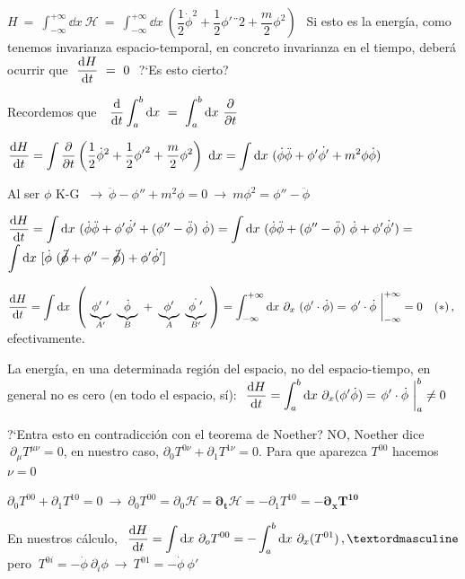 $\displaystyle H \ = \ \int_{-\infty}^{+\infty} \dd x \ \mathcal H \ = \ \int_{-\infty}^{+\infty} \dd x  \ \left( \dfrac 1 2 \dot \phi^2 + \dfrac 1 2 {\phi'}¨2+\dfrac m 2 \phi^2 \right)\ \ $ Si esto es la energía, como tenemos invarianza espacio-temporal, en concreto invarianza en el tiempo, deberá ocurrir que $\ \displaystyle \dv{H}{t} \ = \ 0 \ $ ?`Es esto cierto?

\textcolor{gris}{ Recordemos que $\ \ \displaystyle \dv{t} \int_a^b \dd x \ = \ \int_a^b \dd x \ \pdv{t} $}

\vspace{3mm}

$\displaystyle \dv{H}{t}=\int \pdv{t} \left( \dfrac 1 2 \dot \phi^2 + \dfrac 1 2 {\phi'}^2 + \dfrac m 2 \phi^2 \right) \ \dd x = \int \dd x \ (\dot \phi \ddot \phi + \phi' \dot{\phi'} + m^2 \phi \dot \phi) $

Al ser $\phi$ K-G $ \ \to \ \ddot \phi - \phi'' + m^2 \phi=0 \ \to \ m\phi^2=\phi''-\ddot \phi$

$\displaystyle \dv{H}{t}=  \int \dd x \ ( \dot \phi \ddot \phi + \phi' \dot{\phi'} + (\phi''-\ddot \phi) \ \dot \phi )=
\int \dd x \ ( \dot \phi \ddot \phi + (\phi''-\ddot \phi) \ \dot \phi + \phi' \dot{\phi'}  )=$
$\displaystyle \int \dd x \  [ \dot \phi \ (\cancel{\ddot \phi} + \phi'' - \cancel{\ddot \phi} ) + \phi' \dot{\phi'} ]   $

$\displaystyle \dv{H}{t}=\int \dd x \ \left( \  \underbrace{ \phi'\ '}_{A'}  \ \underbrace{\dot \phi}_{B} \ + \  \underbrace{\phi'}_{A} \  \underbrace{\dot{\phi \ '}}_{B'} \  \right) = \int_{-\infty}^{+\infty} \dd x \ \partial_x \ (\phi' \cdot \dot \phi ) = \eval{\phi' \cdot \dot \phi \ }_{-\infty}^{+\infty} = 0 \quad (*) \, , \ $ efectivamente.

La energía, en una determinada región del espacio, no del espacio-tiempo, en general no es cero (en todo el espacio, sí): $\ \displaystyle \dv{H}{t}=\int_a^b \dd x \ \partial_x (\phi' \dot \phi)=\eval{\phi' \cdot \dot \phi \ }_{a}^{b} \neq 0$


?`Entra esto en contradicción con el teorema de Noether? NO, Noether dice $\ \partial_\mu T^{\mu \nu} = 0 $, en nuestro caso, 
$\partial_0 T^{0\nu}+\partial_1 T^{1\nu}=0$. Para que aparezca $T^{00}$ hacemos $\nu=0$

$\partial_0 T^{00}+\partial_1 T^{10}=0 \ \to \ \partial_0 T^{00}=\partial_0 \mathcal H = \boldsymbol{ \partial_t \mathcal H} = - \partial_1 T^{10}= \boldsymbol{ -\partial_x T^{10} }$


En nuestros cálculo, $\ \displaystyle \dv{H}{t}=\int \dd x \ \partial_o T^{00}=-\int_a^b \dd x \ \partial_x (T^{01})\, , º  $ pero $\ T^{0i}=- \dot \phi \ \partial_i \phi \ \to \ T^{01} = - \dot \phi \ \phi'$

